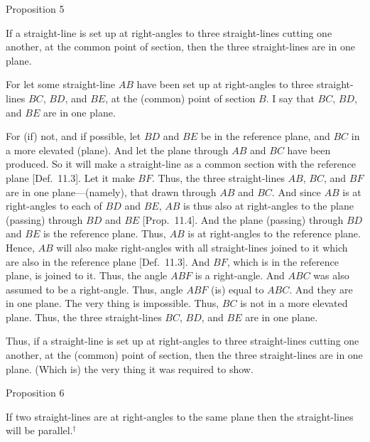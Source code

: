 
\begin{center}
{\large Proposition 5}
\end{center}

If a straight-line is set up at right-angles to three straight-lines cutting one another, at the common
point of section, then the three straight-lines are in one plane.

\centerline{}

For let some straight-line $AB$ have been set up at right-angles
to three straight-lines $BC$, $BD$, and $BE$, at the (common) point of
section $B$. I say that $BC$, $BD$, and $BE$ are in  one plane.

For (if) not, and if possible, let $BD$ and $BE$ be in the reference plane,
and $BC$ in a more elevated (plane).  And let the plane through $AB$ and
$BC$ have been produced. So it will make a straight-line as a
common section with the reference plane [Def.~11.3]. 
Let it make $BF$. Thus, the three straight-lines $AB$, $BC$, and $BF$
are in one plane---(namely), that drawn through $AB$ and $BC$. And since
$AB$ is at right-angles to each of $BD$ and $BE$, $AB$ is thus also at right-angles to the plane (passing) through $BD$ and $BE$ [Prop.~11.4]. And the plane (passing)
through $BD$ and $BE$ is the reference plane. Thus, $AB$ is at
right-angles to the reference plane. Hence, $AB$ will also make right-angles
with all straight-lines joined to it which are also in the reference plane [Def.~11.3].
And $BF$, which is in the reference plane, is joined to  it. Thus, the angle
$ABF$ is a right-angle. And $ABC$ was also assumed to be a right-angle.
Thus, angle $ABF$ (is) equal to $ABC$. And they are in one
plane. The very thing is impossible. Thus, $BC$ is not in a more elevated
plane. Thus, the three straight-lines $BC$, $BD$, and $BE$ are in one plane.

Thus, if a straight-line is set up at right-angles to three straight-lines cutting
one another, at the (common) point of section, then the three straight-lines
are in one plane. (Which is) the very thing it was required to show.


\begin{center}
{\large Proposition 6}
\end{center}

If two straight-lines are at right-angles to the same
plane then the straight-lines will be parallel.$^\dag$

